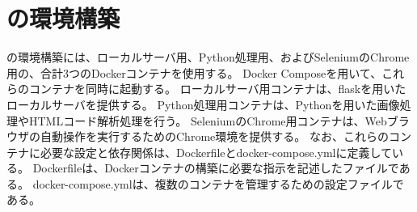 \section{\toolName の環境構築}\label{sec:MixVRT_env_gen}
\toolName の環境構築には、ローカルサーバ用、Python処理用、およびSeleniumのChrome用の、合計3つのDockerコンテナ\cite{Docker Container}を使用する。
Docker Compose\cite{Docker Compose}を用いて、これらのコンテナを同時に起動する。
ローカルサーバ用コンテナは、flaskを用いたローカルサーバを提供する。
Python処理用コンテナは、Pythonを用いた画像処理やHTMLコード解析処理を行う。
SeleniumのChrome用コンテナは、Webブラウザの自動操作を実行するためのChrome環境を提供する。
なお、これらのコンテナに必要な設定と依存関係は、Dockerfileとdocker-compose.ymlに定義している。
Dockerfileは、Dockerコンテナの構築に必要な指示を記述したファイルである。
docker-compose.ymlは、複数のコンテナを管理するための設定ファイルである。